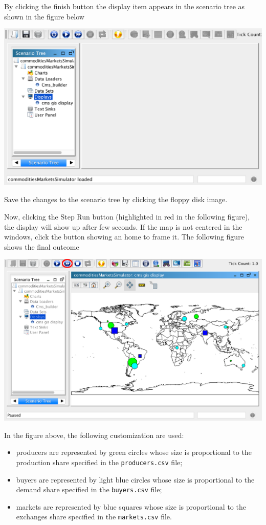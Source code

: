 \documentclass{article}
\begin{document}
By clicking the finish button the display item appears in the scenario tree as shown in the figure below

\includegraphics[scale=0.35]{fig_cms_rs_gis9}

Save the changes to the scenario tree by clicking the floppy disk image.

Now, clicking the Step Run button (highlighted in red in the following figure), the display will show up after few seconds. If the map is not centered in the windows, click the button showing an home to frame it. The following figure shows the final outcome  

\includegraphics[scale=0.35]{fig_cms_rs_gis10}

In the figure above, the following customization are used:
\begin{itemize}
	\item producers are represented by green circles whose size is proportional to the production share specified in the \verb+producers.csv+ file;
	\item buyers are represented by light blue circles whose size is proportional to the demand share specified in the \verb+buyers.csv+ file;
	\item markets are represented by blue squares whose size is proportional to the exchanges share specified in the \verb+markets.csv+ file.
\end{itemize}
\end{document}
